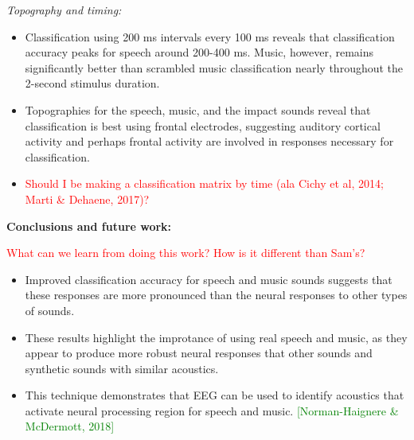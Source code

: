 \documentclass[11pt]{article}
\begin{document}
\textit{Topography and timing:}

\begin{itemize}
\item Classification using 200 ms intervals every 100 ms reveals that classification accuracy peaks for speech around 200-400 ms.  Music, however, remains significantly better than scrambled music classification nearly throughout the 2-second stimulus duration.
\item Topographies for the speech, music, and the impact sounds reveal that classification is best using frontal electrodes, suggesting auditory cortical activity and perhaps frontal activity are involved in responses necessary for classification.
\item \textcolor{red}{Should I be making a classification matrix by time (ala Cichy et al, 2014; Marti \& Dehaene, 2017)?}
\end{itemize}

\textbf{Conclusions and future work:}

\textcolor{red}{What can we learn from doing this work?  How is it different than Sam's?}

\begin{itemize}
\item Improved classification accuracy for speech and music sounds suggests that these responses are more pronounced than the neural responses to other types of sounds.  
\item These results highlight the improtance of using real speech and music, as they appear to produce more robust neural responses that other sounds and synthetic sounds with similar acoustics.
\item This technique demonstrates that EEG can be used to identify acoustics that activate neural processing region for speech and music. \textcolor{green}{[Norman-Haignere \& McDermott, 2018]}
\end{itemize}
\end{document}
